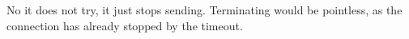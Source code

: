 No it does not try, it just stops sending. Terminating would be pointless, as the connection has already stopped by the timeout.
